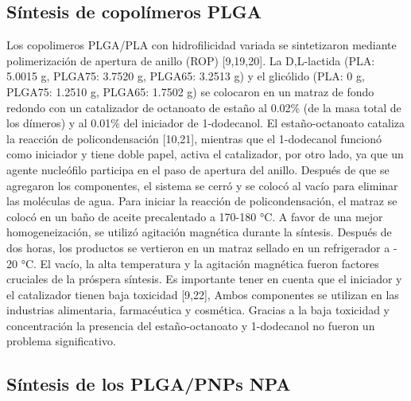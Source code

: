 \documentclass[10pt,letterpaper]{article}
\begin{document}
\begin{multicols}{2}
	
	\subsection{Síntesis de copolímeros  PLGA }
	
	Los copolimeros  PLGA/PLA  con  hidrofilicidad  variada  se sintetizaron    mediante  polimerización de apertura de anillo (ROP) [9,19,20]. La D,L-lactida  (PLA: 5.0015 g, PLGA75: 3.7520 g, PLGA65: 3.2513 g) y el glicólido  (PLA:  0 g, PLGA75: 1.2510 g, PLGA65: 1.7502 g) se colocaron    en un matraz de fondo  redondo con un catalizador  de octanoato de estaño al 0.02\%  (de la masa total de  los dímeros) y al 0.01\% del iniciador de 1-dodecanol.  El  estaño-octanoato cataliza  la  reacción  de policondensación  [10,21],  mientras que  el  1-dodecanol  funcionó  como  iniciador  y  tiene  doble papel, activa  el  catalizador, por otro  lado, ya  que  un  agente nucleófilo    participa  en el paso de apertura del  anillo. Después de   que se agregaron   los  componentes,   el  sistema  se  cerró y se colocó  al  vacío  para  eliminar  las  moléculas de agua.  Para  iniciar  la  reacción de policondensación,   el  matraz  se colocó en un  baño de aceite precalentado a 170-180 °C.  A favor  de  una mejor  homogeneización,  se utilizó  agitación   magnética  durante  la  síntesis. Después de  dos  horas,  los  productos  se  vertieron  en  un  matraz sellado en un  refrigerador a - 20 °C. El  vacío, la  alta  temperatura  y la agitación magnética  fueron factores cruciales  de  la  próspera   síntesis. Es    importante  tener  en cuenta  que  el  iniciador  y  el  catalizador  tienen  baja  toxicidad  [9,22],  Ambos  componentes se  utilizan  en  las industrias alimentaria,  farmacéutica  y cosmética.    Gracias  a  la  baja  toxicidad  y  concentración  la  presencia  del    estaño-octanoato y 1-dodecanol  no fueron  un  problema significativo.
		
	\subsection{Síntesis de  los PLGA/PNPs NPA}



\end{multicols}
\end{document}
